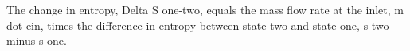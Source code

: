 The change in entropy, Delta S one-two, equals the mass flow rate at the inlet, m dot ein, times the difference in entropy between state two and state one, s two minus s one.